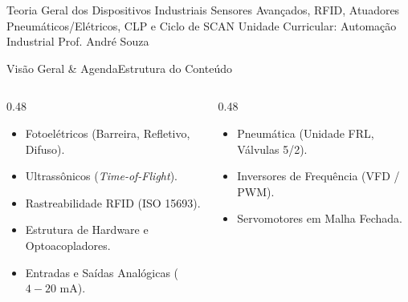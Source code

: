 
\senaicover
  {Teoria Geral dos Dispositivos Industriais}
  {Sensores Avançados, RFID, Atuadores Pneumáticos/Elétricos, CLP e Ciclo de SCAN}
  {Unidade Curricular: Automação Industrial}
  {Prof. André Souza}

\begin{senaiframe}{Visão Geral \& Agenda}{Estrutura do Conteúdo}
  \begin{columns}[t]
    \begin{column}{0.48\textwidth}
      \begin{tcolorbox}[senaibluecard, title={1. Sensoriamento Avançado}]
        \begin{itemize}
          \item Fotoelétricos (Barreira, Refletivo, Difuso).
          \item Ultrassônicos (\textit{Time-of-Flight}).
          \item Rastreabilidade RFID (ISO 15693).
        \end{itemize}
      \end{tcolorbox}
      \vspace{4pt}
      \begin{tcolorbox}[senaiambercard, title={3. Arquitetura do CLP}]
        \begin{itemize}
          \item Estrutura de Hardware e Optoacopladores.
          \item Entradas e Saídas Analógicas ($4-20\text{ mA}$).
        \end{itemize}
      \end{tcolorbox}
    \end{column}
    \begin{column}{0.48\textwidth}
      \begin{tcolorbox}[senairedcard, title={2. Atuadores Industriais}]
        \begin{itemize}
          \item Pneumática (Unidade FRL, Válvulas 5/2).
          \item Inversores de Frequência (VFD / PWM).
          \item Servomotores em Malha Fechada.
        \end{itemize}

\end{tcolorbox}
\end{column}
\end{columns}
\end{senaiframe}
